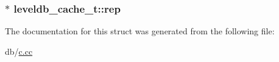 \subsubsection[{rep}]{$\ast$ leveldb\+\_\+cache\+\_\+t\+::rep}\label{structleveldb__cache__t_a78f74e9a86ea86296e562fe990751a4a}


The documentation for this struct was generated from the following file\+:\begin{DoxyCompactItemize}
\item 
db/\hyperlink{c_8cc}{c.\+cc}\end{DoxyCompactItemize}
